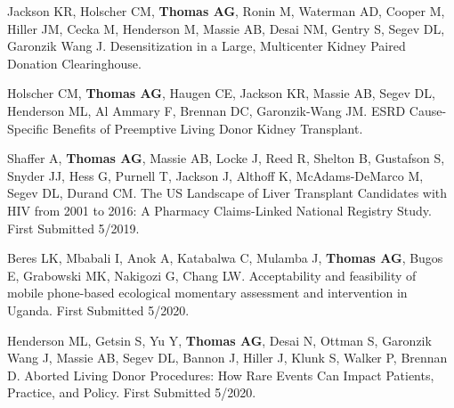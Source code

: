 \documentclass[10pt]{article}
\renewcommand{\section}[1]{\pagebreak[3]%
    \vspace{1.3\baselineskip}%
    \phantomsection\addcontentsline{toc}{section}{#1}%
    \noindent\llap{\scshape\smash{\parbox[t]{\marginparwidth}{\hyphenpenalty=10000\raggedright #1}}}%
    \vspace{-\baselineskip}\par}
\begin{document}
\begin{bibenum}


\item Jackson KR, Holscher CM, \textbf{Thomas AG}, Ronin M, Waterman AD,
  Cooper M, Hiller JM, Cecka M, Henderson M, Massie AB, Desai NM, Gentry S,
  Segev DL, Garonzik Wang J.
  Desensitization in a Large, Multicenter Kidney Paired Donation
  Clearinghouse.

\item Holscher CM\dag, \textbf{Thomas AG\dag}, Haugen CE, Jackson KR,
  Massie AB, Segev DL, Henderson ML, Al Ammary F, Brennan DC, Garonzik-Wang JM.
  ESRD Cause-Specific Benefits of Preemptive Living Donor Kidney Transplant.

\item Shaffer A, \textbf{Thomas AG}, Massie AB, Locke J, Reed R, Shelton B,
  Gustafson S, Snyder JJ, Hess G, Purnell T, Jackson J, Althoff K,
  McAdams-DeMarco M, Segev DL, Durand CM.
  The US Landscape of Liver Transplant Candidates with HIV from
  2001 to 2016: A Pharmacy Claims-Linked National Registry Study.
  First Submitted 5/2019.

\item Beres LK, Mbabali I, Anok A, Katabalwa C, Mulamba J,
  \textbf{Thomas AG}, Bugos E, Grabowski MK, Nakigozi G,
  Chang LW.
  Acceptability and feasibility of mobile phone-based
  ecological momentary assessment and intervention in Uganda.
  First Submitted 5/2020.

\item Henderson ML, Getsin S, Yu Y, \textbf{Thomas AG}, Desai N,
  Ottman S, Garonzik Wang J, Massie AB, Segev DL, Bannon J,
  Hiller J, Klunk S, Walker P, Brennan D.
  Aborted Living Donor Procedures: How Rare Events Can Impact
  Patients, Practice, and Policy.
  First Submitted 5/2020.

\end{bibenum}


\end{document}
